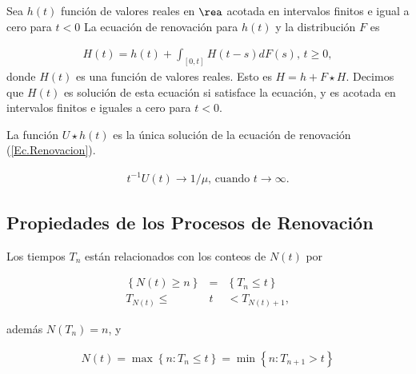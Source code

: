 \begin{Def}
Sea $h\left(t\right)$ funci\'on de valores reales en $\rea$ acotada en intervalos finitos e igual a cero para $t<0$ La ecuaci\'on de renovaci\'on para $h\left(t\right)$ y la distribuci\'on $F$ es

\begin{eqnarray}\label{Ec.Renovacion}
H\left(t\right)=h\left(t\right)+\int_{\left[0,t\right]}H\left(t-s\right)dF\left(s\right)\textrm{,    }t\geq0,
\end{eqnarray}
donde $H\left(t\right)$ es una funci\'on de valores reales. Esto es $H=h+F\star H$. Decimos que $H\left(t\right)$ es soluci\'on de esta ecuaci\'on si satisface la ecuaci\'on, y es acotada en intervalos finitos e iguales a cero para $t<0$.
\end{Def}

\begin{Prop}
La funci\'on $U\star h\left(t\right)$ es la \'unica soluci\'on de la ecuaci\'on de renovaci\'on (\ref{Ec.Renovacion}).
\end{Prop}

\begin{Teo}
\begin{eqnarray*}
t^{-1}U\left(t\right)\rightarrow 1/\mu\textrm{,    cuando }t\rightarrow\infty.
\end{eqnarray*}
\end{Teo}

%
\subsection{Propiedades de los Procesos de Renovaci\'on}
%

Los tiempos $T_{n}$ est\'an relacionados con los conteos de $N\left(t\right)$ por

\begin{eqnarray*}
\left\{N\left(t\right)\geq n\right\}&=&\left\{T_{n}\leq t\right\}\\
T_{N\left(t\right)}\leq &t&<T_{N\left(t\right)+1},
\end{eqnarray*}

adem\'as $N\left(T_{n}\right)=n$, y 

\begin{eqnarray*}
N\left(t\right)=\max\left\{n:T_{n}\leq t\right\}=\min\left\{n:T_{n+1}>t\right\}
\end{eqnarray*}

